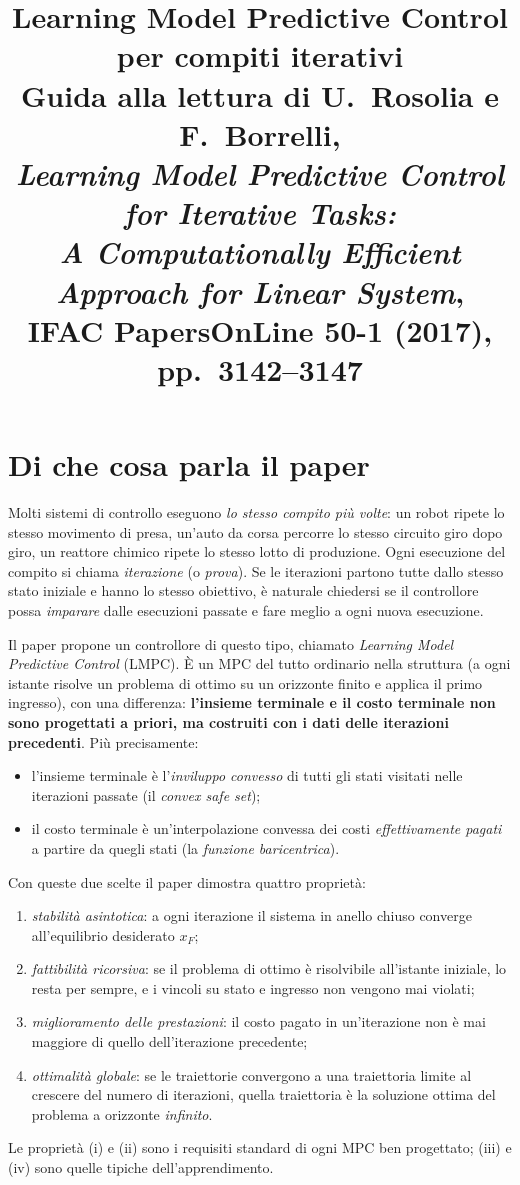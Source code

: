 \documentclass[11pt,a4paper]{article}
\title{Learning Model Predictive Control per compiti iterativi\\[4pt]
\large Guida alla lettura di U.~Rosolia e F.~Borrelli,\\
\emph{Learning Model Predictive Control for Iterative Tasks:\\
A Computationally Efficient Approach for Linear System},\\
IFAC PapersOnLine 50-1 (2017), pp.~3142--3147}
\author{}
\date{}
\theoremstyle{definition}
\theoremstyle{plain}
\theoremstyle{remark}
\begin{document}
\maketitle
\tableofcontents
\newpage

\section{Di che cosa parla il paper}\label{sec:intro}

Molti sistemi di controllo eseguono \emph{lo stesso compito più volte}: un
robot ripete lo stesso movimento di presa, un'auto da corsa percorre lo stesso
circuito giro dopo giro, un reattore chimico ripete lo stesso lotto di
produzione. Ogni esecuzione del compito si chiama \emph{iterazione} (o
\emph{prova}). Se le iterazioni partono tutte dallo stesso stato iniziale e
hanno lo stesso obiettivo, è naturale chiedersi se il controllore possa
\emph{imparare} dalle esecuzioni passate e fare meglio a ogni nuova
esecuzione.

Il paper propone un controllore di questo tipo, chiamato \emph{Learning Model
Predictive Control} (LMPC). È un MPC del tutto ordinario nella struttura (a
ogni istante risolve un problema di ottimo su un orizzonte finito e applica il
primo ingresso), con una differenza: \textbf{l'insieme terminale e il costo
terminale non sono progettati a priori, ma costruiti con i dati delle
iterazioni precedenti}. Più precisamente:
\begin{itemize}
  \item l'insieme terminale è l'\emph{inviluppo convesso} di tutti gli stati
        visitati nelle iterazioni passate (il \emph{convex safe set});
  \item il costo terminale è un'interpolazione convessa dei costi
        \emph{effettivamente pagati} a partire da quegli stati (la
        \emph{funzione baricentrica}).
\end{itemize}
Con queste due scelte il paper dimostra quattro proprietà:
\begin{enumerate}
  \item[(i)] \emph{stabilità asintotica}: a ogni iterazione il sistema in
        anello chiuso converge all'equilibrio desiderato $x_F$;
  \item[(ii)] \emph{fattibilità ricorsiva}: se il problema di ottimo è
        risolvibile all'istante iniziale, lo resta per sempre, e i vincoli su
        stato e ingresso non vengono mai violati;
  \item[(iii)] \emph{miglioramento delle prestazioni}: il costo pagato in
        un'iterazione non è mai maggiore di quello dell'iterazione precedente;
  \item[(iv)] \emph{ottimalità globale}: se le traiettorie convergono a una
        traiettoria limite al crescere del numero di iterazioni, quella
        traiettoria è la soluzione ottima del problema a orizzonte
        \emph{infinito}.
\end{enumerate}
Le proprietà (i) e (ii) sono i requisiti standard di ogni MPC ben progettato;
(iii) e (iv) sono quelle tipiche dell'apprendimento.
\end{document}
